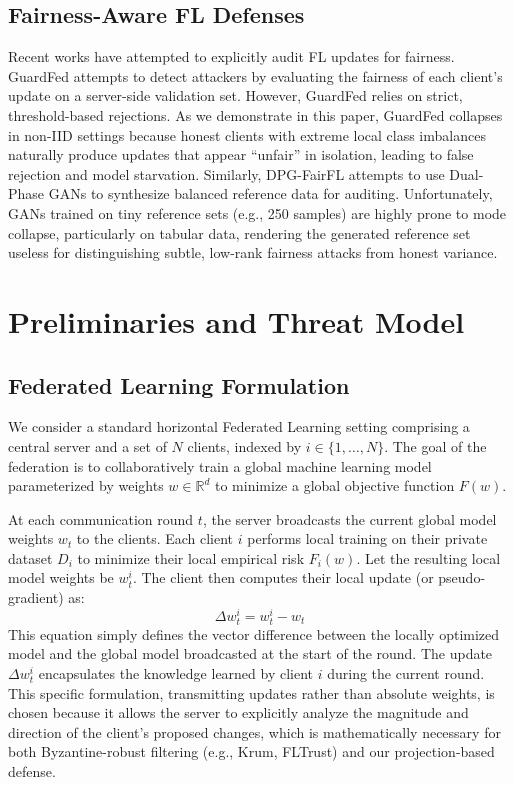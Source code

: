 \documentclass[journal]{IEEEtran}
\begin{document}
\subsection{Fairness-Aware FL Defenses}
Recent works have attempted to explicitly audit FL updates for fairness. GuardFed \cite{guardfed2024} attempts to detect attackers by evaluating the fairness of each client's update on a server-side validation set. However, GuardFed relies on strict, threshold-based rejections. As we demonstrate in this paper, GuardFed collapses in non-IID settings because honest clients with extreme local class imbalances naturally produce updates that appear ``unfair'' in isolation, leading to false rejection and model starvation. Similarly, DPG-FairFL \cite{dpgfairfl2025} attempts to use Dual-Phase GANs to synthesize balanced reference data for auditing. Unfortunately, GANs trained on tiny reference sets (e.g., 250 samples) are highly prone to mode collapse, particularly on tabular data, rendering the generated reference set useless for distinguishing subtle, low-rank fairness attacks from honest variance.

\section{Preliminaries and Threat Model}
\subsection{Federated Learning Formulation}
We consider a standard horizontal Federated Learning setting comprising a central server and a set of $N$ clients, indexed by $i \in \{1, \dots, N\}$. The goal of the federation is to collaboratively train a global machine learning model parameterized by weights $w \in \mathbb{R}^d$ to minimize a global objective function $F(w)$. 

At each communication round $t$, the server broadcasts the current global model weights $w_t$ to the clients. Each client $i$ performs local training on their private dataset $D_i$ to minimize their local empirical risk $F_i(w)$. Let the resulting local model weights be $w_t^i$. The client then computes their local update (or pseudo-gradient) as:
\begin{equation}
\Delta w_t^i = w_t^i - w_t
\end{equation}
This equation simply defines the vector difference between the locally optimized model and the global model broadcasted at the start of the round. The update $\Delta w_t^i$ encapsulates the knowledge learned by client $i$ during the current round. This specific formulation, transmitting updates rather than absolute weights, is chosen because it allows the server to explicitly analyze the magnitude and direction of the client's proposed changes, which is mathematically necessary for both Byzantine-robust filtering (e.g., Krum, FLTrust) and our projection-based defense.
\end{document}
